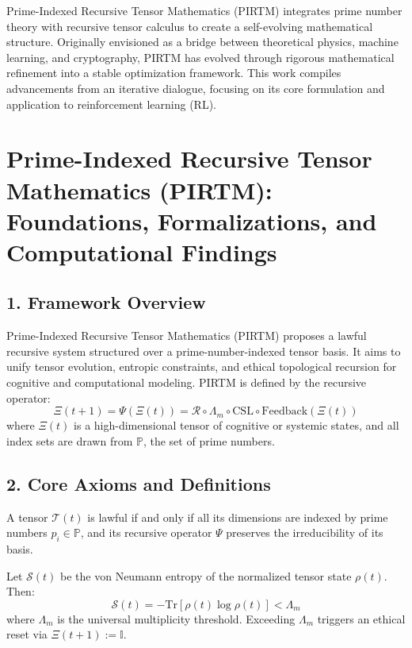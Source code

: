 \documentclass{article}
\theoremstyle{plain}
\begin{document}
Prime-Indexed Recursive Tensor Mathematics (PIRTM) integrates prime number theory with recursive tensor calculus to create a self-evolving mathematical structure. Originally envisioned as a bridge between theoretical physics, machine learning, and cryptography, PIRTM has evolved through rigorous mathematical refinement into a stable optimization framework. This work compiles advancements from an iterative dialogue, focusing on its core formulation and application to reinforcement learning (RL).

\section{Prime-Indexed Recursive Tensor Mathematics (PIRTM): Foundations, Formalizations, and Computational Findings}

\subsection{1. Framework Overview}
Prime-Indexed Recursive Tensor Mathematics (PIRTM) proposes a lawful recursive system structured over a prime-number-indexed tensor basis. It aims to unify tensor evolution, entropic constraints, and ethical topological recursion for cognitive and computational modeling. PIRTM is defined by the recursive operator:
\[
\Xi(t+1) = \Psi(\Xi(t)) = \mathcal{R} \circ \Lambda_m \circ \text{CSL} \circ \text{Feedback}(\Xi(t))
\]
where $\Xi(t)$ is a high-dimensional tensor of cognitive or systemic states, and all index sets are drawn from $\mathbb{P}$, the set of prime numbers.

\subsection{2. Core Axioms and Definitions}

\begin{axiom}
A tensor $\mathcal{T}(t)$ is lawful if and only if all its dimensions are indexed by prime numbers $p_i \in \mathbb{P}$, and its recursive operator $\Psi$ preserves the irreducibility of its basis.
\end{axiom}

\begin{axiom}
Let $\mathcal{S}(t)$ be the von Neumann entropy of the normalized tensor state $\rho(t)$. Then:
\[
\mathcal{S}(t) = -\text{Tr}[\rho(t) \log \rho(t)] < \Lambda_m
\]
where $\Lambda_m$ is the universal multiplicity threshold. Exceeding $\Lambda_m$ triggers an ethical reset via $\Xi(t+1) := \mathbb{I}$.
\end{axiom}
\end{document}
